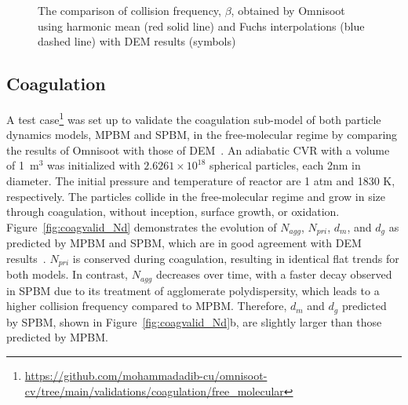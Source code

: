 \begin{figure}[H]
	\centering
	\caption{The comparison of collision frequency, $\beta$, obtained by Omnisoot using harmonic mean (red solid line) and Fuchs interpolations (blue dashed line) with DEM results (symbols)~\citep{goudeli2015coagulation}}
	\label{fig:kernelvalid} 
\end{figure}



\subsection{Coagulation}
A test case\footnote{\href{https://github.com/mohammadadib-cu/omnisoot-cv/tree/main/validations/coagulation/free_molecular}{https://github.com/mohammadadib-cu/omnisoot-cv/tree/main/validations/coagulation/free\_molecular}} was set up to validate the coagulation sub-model of both particle dynamics models, MPBM and SPBM, in the free-molecular regime by comparing the results of Omnisoot with those of DEM~\citep{kholghy2021surface}. An adiabatic CVR with a volume of 1~$\mathrm{m}^3$ was initialized with $2.6261 \times 10^{18}$ spherical particles, each 2nm in diameter. The initial pressure and temperature of reactor are 1 atm and 1830 K, respectively. The particles collide in the free-molecular regime and grow in size through coagulation, without inception, surface growth, or oxidation. Figure~\ref{fig:coagvalid_Nd} demonstrates the evolution of ${N_{agg}}$, ${N_{pri}}$, ${d_m}$, and ${d_g}$ as predicted by MPBM and SPBM, which are in good agreement with DEM results~\citep{kholghy2021surface}. ${N_{pri}}$ is conserved during coagulation, resulting in identical flat trends for both models. In contrast, ${N_{agg}}$ decreases over time, with a faster decay observed in SPBM due to its treatment of agglomerate polydispersity, which leads to a higher collision frequency compared to MPBM. Therefore, $d_m$ and $d_g$  predicted by SPBM, shown in Figure~\ref{fig:coagvalid_Nd}b, are slightly larger than those predicted by MPBM.

